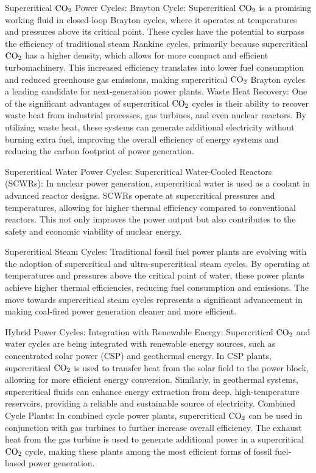     Supercritical $\ce{CO2}$ Power Cycles: Brayton Cycle: Supercritical $\ce{CO2}$ is a
        promising working fluid in closed-loop Brayton cycles, where it operates
        at temperatures and pressures above its critical point. These cycles
        have the potential to surpass the efficiency of traditional steam
        Rankine cycles, primarily because supercritical $\ce{CO2}$ has a higher
        density, which allows for more compact and efficient turbomachinery.
        This increased efficiency translates into lower fuel consumption and
        reduced greenhouse gas emissions, making supercritical $\ce{CO2}$ Brayton
        cycles a leading candidate for next-generation power plants. Waste Heat
        Recovery: One of the significant advantages of supercritical $\ce{CO2}$ cycles
        is their ability to recover waste heat from industrial processes, gas
        turbines, and even nuclear reactors. By utilizing waste heat, these
        systems can generate additional electricity without burning extra fuel,
        improving the overall efficiency of energy systems and reducing the
        carbon footprint of power generation.

    Supercritical Water Power Cycles: Supercritical Water-Cooled Reactors
        (SCWRs): In nuclear power generation, supercritical water is used as a
        coolant in advanced reactor designs. SCWRs operate at supercritical
        pressures and temperatures, allowing for higher thermal efficiency
        compared to conventional reactors. This not only improves the power
        output but also contributes to the safety and economic viability of
        nuclear energy.

    Supercritical Steam Cycles: Traditional fossil fuel power plants are
        evolving with the adoption of supercritical and ultra-supercritical
        steam cycles. By operating at temperatures and pressures above the
        critical point of water, these power plants achieve higher thermal
        efficiencies, reducing fuel consumption and emissions. The move towards
        supercritical steam cycles represents a significant advancement in
        making coal-fired power generation cleaner and more efficient.
		
    Hybrid Power Cycles: Integration with Renewable Energy: Supercritical $\ce{CO2}$
        and water cycles are being integrated with renewable energy sources,
        such as concentrated solar power (CSP) and geothermal energy. In CSP
        plants, supercritical $\ce{CO2}$ is used to transfer heat from the solar field
        to the power block, allowing for more efficient energy conversion.
        Similarly, in geothermal systems, supercritical fluids can enhance
        energy extraction from deep, high-temperature reservoirs, providing a
        reliable and sustainable source of electricity. Combined Cycle Plants:
        In combined cycle power plants, supercritical $\ce{CO2}$ can be used in
        conjunction with gas turbines to further increase overall efficiency.
        The exhaust heat from the gas turbine is used to generate additional
        power in a supercritical $\ce{CO2}$ cycle, making these plants among the most
        efficient forms of fossil fuel-based power generation.

